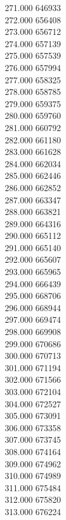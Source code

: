 { 271.000	646933 \\
 272.000	656408 \\
 273.000	656712 \\
 274.000	657139 \\
 275.000	657539 \\
 276.000	657994 \\
 277.000	658325 \\
 278.000	658785 \\
 279.000	659375 \\
 280.000	659760 \\
 281.000	660792 \\
 282.000	661180 \\
 283.000	661628 \\
 284.000	662034 \\
 285.000	662446 \\
 286.000	662852 \\
 287.000	663347 \\
 288.000	663821 \\
 289.000	664316 \\
 290.000	665112 \\
 291.000	665140 \\
 292.000	665607 \\
 293.000	665965 \\
 294.000	666439 \\
 295.000	668706 \\
 296.000	668944 \\
 297.000	669474 \\
 298.000	669908 \\
 299.000	670686 \\
 300.000	670713 \\
 301.000	671194 \\
 302.000	671566 \\
 303.000	672104 \\
 304.000	672527 \\
 305.000	673091 \\
 306.000	673358 \\
 307.000	673745 \\
 308.000	674164 \\
 309.000	674962 \\
 310.000	674989 \\
 311.000	675484 \\
 312.000	675820 \\
 313.000	676224 \\
}
